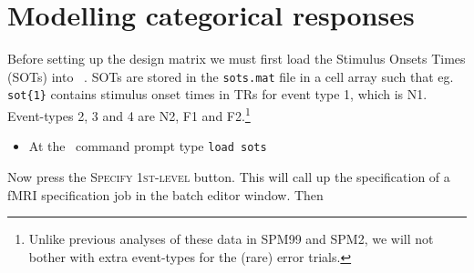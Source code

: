 \section{Modelling categorical responses}

Before setting up the design matrix we must first load the Stimulus Onsets Times (SOTs) into \matlab\ . SOTs are stored in the \texttt{sots.mat} file in a cell array such that eg. \texttt{sot\{1\}} contains stimulus onset times in TRs for event type 1, which is N1. Event-types 2, 3 and 4 are N2, F1 and F2.\footnote{Unlike previous analyses of these data in SPM99 and SPM2, we will not bother with extra event-types for the (rare) error trials.}
\begin{itemize}
\item At the \matlab\ command prompt type \texttt{load sots}
\end{itemize}

Now press the \textsc{Specify 1st-level} button. This will call up the specification of a fMRI specification job in the batch editor window. Then


